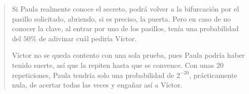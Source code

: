 \begin{quote}
	Si Paula realmente conoce el secreto, podrá volver a la bifurcación por el pasillo solicitado, abriendo, si es preciso, la puerta.
	Pero en caso de no conocer la clave, al entrar por uno de los pasillos, tenía una probabilidad del $50\%$ de adivinar cuál pediría Víctor.
	
	
	
	Víctor no se queda contento con una sola prueba, pues Paula podría haber tenido suerte, así que la repiten hasta que se convence. Con unas 20 repeticiones, Paula tendría solo una probabilidad de $2^{-20}$, prácticamente nula, de acertar todas las veces y engañar así a Víctor.
	

\end{quote}
